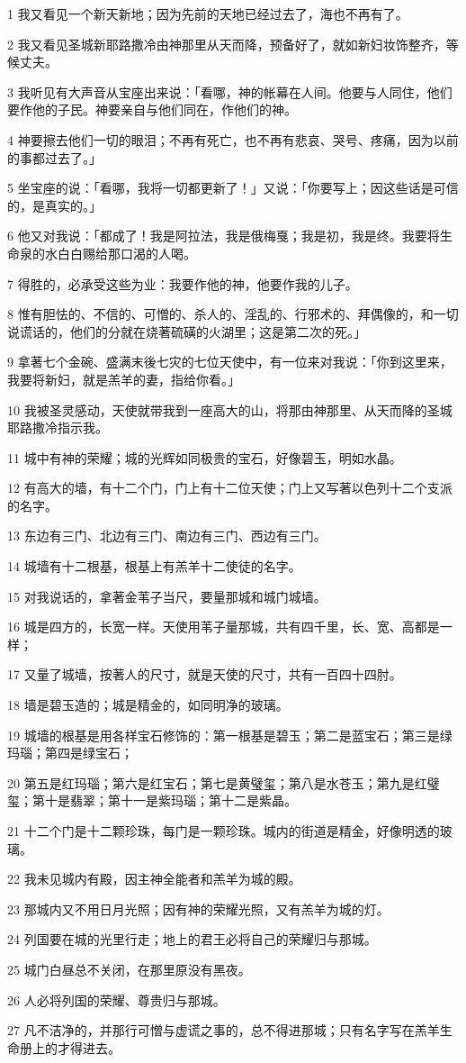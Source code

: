 \par 1 我又看见一个新天新地；因为先前的天地已经过去了，海也不再有了。
\par 2 我又看见圣城新耶路撒冷由神那里从天而降，预备好了，就如新妇妆饰整齐，等候丈夫。
\par 3 我听见有大声音从宝座出来说：「看哪，神的帐幕在人间。他要与人同住，他们要作他的子民。神要亲自与他们同在，作他们的神。
\par 4 神要擦去他们一切的眼泪；不再有死亡，也不再有悲哀、哭号、疼痛，因为以前的事都过去了。」
\par 5 坐宝座的说：「看哪，我将一切都更新了！」又说：「你要写上；因这些话是可信的，是真实的。」
\par 6 他又对我说：「都成了！我是阿拉法，我是俄梅戛；我是初，我是终。我要将生命泉的水白白赐给那口渴的人喝。
\par 7 得胜的，必承受这些为业：我要作他的神，他要作我的儿子。
\par 8 惟有胆怯的、不信的、可憎的、杀人的、淫乱的、行邪术的、拜偶像的，和一切说谎话的，他们的分就在烧著硫磺的火湖里；这是第二次的死。」
\par 9 拿著七个金碗、盛满末後七灾的七位天使中，有一位来对我说：「你到这里来，我要将新妇，就是羔羊的妻，指给你看。」
\par 10 我被圣灵感动，天使就带我到一座高大的山，将那由神那里、从天而降的圣城耶路撒冷指示我。
\par 11 城中有神的荣耀；城的光辉如同极贵的宝石，好像碧玉，明如水晶。
\par 12 有高大的墙，有十二个门，门上有十二位天使；门上又写著以色列十二个支派的名字。
\par 13 东边有三门、北边有三门、南边有三门、西边有三门。
\par 14 城墙有十二根基，根基上有羔羊十二使徒的名字。
\par 15 对我说话的，拿著金苇子当尺，要量那城和城门城墙。
\par 16 城是四方的，长宽一样。天使用苇子量那城，共有四千里，长、宽、高都是一样；
\par 17 又量了城墙，按著人的尺寸，就是天使的尺寸，共有一百四十四肘。
\par 18 墙是碧玉造的；城是精金的，如同明净的玻璃。
\par 19 城墙的根基是用各样宝石修饰的：第一根基是碧玉；第二是蓝宝石；第三是绿玛瑙；第四是绿宝石；
\par 20 第五是红玛瑙；第六是红宝石；第七是黄璧玺；第八是水苍玉；第九是红璧玺；第十是翡翠；第十一是紫玛瑙；第十二是紫晶。
\par 21 十二个门是十二颗珍珠，每门是一颗珍珠。城内的街道是精金，好像明透的玻璃。
\par 22 我未见城内有殿，因主神全能者和羔羊为城的殿。
\par 23 那城内又不用日月光照；因有神的荣耀光照，又有羔羊为城的灯。
\par 24 列国要在城的光里行走；地上的君王必将自己的荣耀归与那城。
\par 25 城门白昼总不关闭，在那里原没有黑夜。
\par 26 人必将列国的荣耀、尊贵归与那城。
\par 27 凡不洁净的，并那行可憎与虚谎之事的，总不得进那城；只有名字写在羔羊生命册上的才得进去。

